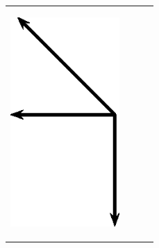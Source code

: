 \begin{enumerate}[noitemsep, label=\textbf{\arabic*}. ]
\begin{center}
\begin{xtabular*}{\mytablewidth}[t]{|p{10\mystarwidth}|p{10\mystarwidth}|p{10\mystarwidth}|p{10\mystarwidth}|}
    
        
    \setcounter{subfigure}{0}

\label{m38819*id197110}
    \begin{center}
    \label{m38819*id197110!!!underscore!!!media}\label{m38819*id197110!!!underscore!!!printimage}\includegraphics[height=300px]{col11305.imgs/m38819_PG11C1_073.png} %
        
      \vspace{2pt}
    \vspace{.1in}
    
    \end{center}



    \addtocounter{footnote}{-0}
     &
    
    
        
    \setcounter{subfigure}{0}


\end{xtabular*}
\end{center}
\end{enumerate}
